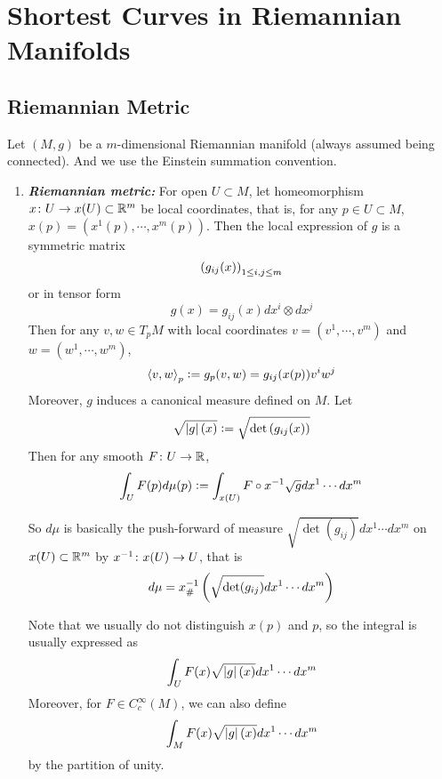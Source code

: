 \chapter{Shortest Curves in Riemannian Manifolds}

\section{Riemannian Metric}

Let $(M,g)$ be a $m$-dimensional Riemannian manifold (always assumed being connected). And we use the Einstein summation convention.

\begin{enumerate}[label=\arabic{*}.]
	\item {\emph{\textbf{Riemannian metric:}}} For open $U \subset M$, let homeomorphism $x \colon U \rightarrow x(U) \subset \mathbb{R}^m$ be local coordinates, that is, for any $p \in U \subset M$, $x(p) = (x^1(p),\cdots,x^m(p))$. Then the local expression of $g$ is a symmetric matrix
	\begin{equation*}
		\left(g_{ij}(x)\right)_{1\leq i,j \leq m}
	\end{equation*}
	or in tensor form
	\begin{equation*}
		g(x) = g_{ij}(x)dx^i\otimes dx^j
	\end{equation*}
	Then for any $v,w \in T_pM$ with local coordinates $v = (v^1,\cdots,v^m)$ and $w = (w^1,\cdots,w^m)$,
	\begin{equation*}
		\left\langle v,w \right\rangle_p \vcentcolon= g_p(v,w) = g_{ij}(x(p))v^iw^j
	\end{equation*}
	Moreover, $g$ induces a canonical measure defined on $M$. Let
	\begin{equation*}
		\sqrt{\left\lvert g\right\lvert(x)} \vcentcolon= \sqrt{\det\left(g_{ij}(x)\right)} 
	\end{equation*}
	Then for any smooth $F \colon U \rightarrow \mathbb{R}$,
	\begin{equation*}
		\int_U F(p)d\mu(p) \vcentcolon= \int_{x(U)} F\circ x^{-1}\sqrt{g}dx^1\cdots dx^m
	\end{equation*}
	\begin{rmk}
		So $d\mu$ is basically the push-forward of measure $\sqrt{\det(g_{ij})}dx^1\cdots dx^m$ on $x(U) \subset \mathbb{R}^m$ by $x^{-1}\colon x(U) \rightarrow U$, that is
		\begin{equation*}
			d\mu = x^{-1}_\#\left(\sqrt{\det(g_{ij})}dx^1\cdots dx^m\right)
		\end{equation*}
	\end{rmk}
	Note that we usually do not distinguish $x(p)$ and $p$, so the integral is usually expressed as
	\begin{equation*}
		\int_{U} F(x)\sqrt{\left\lvert g\right\lvert(x)}dx^1\cdots dx^m
	\end{equation*}
	Moreover, for $F\in C_c^\infty(M)$, we can also define
	\begin{equation*}
		\int_M F(x)\sqrt{\left\lvert g\right\lvert(x)}dx^1\cdots dx^m
	\end{equation*}
	by the partition of unity.


\end{enumerate}
